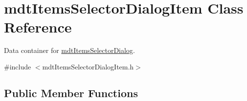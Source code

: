 \hypertarget{classmdt_items_selector_dialog_item}{\section{mdt\-Items\-Selector\-Dialog\-Item Class Reference}
\label{classmdt_items_selector_dialog_item}
}


Data container for \hyperlink{classmdt_items_selector_dialog}{mdt\-Items\-Selector\-Dialog}.  




{\ttfamily \#include $<$mdt\-Items\-Selector\-Dialog\-Item.\-h$>$}

\subsection*{Public Member Functions}
